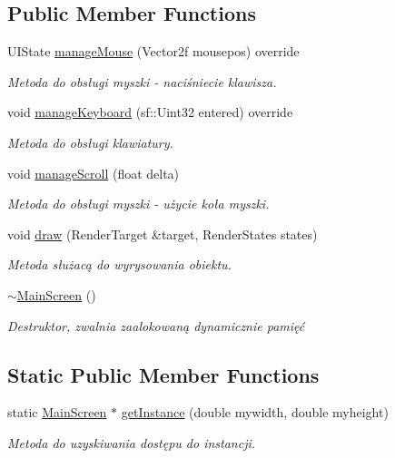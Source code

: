 \subsection*{Public Member Functions}
\begin{DoxyCompactItemize}
\item 
U\+I\+State \mbox{\hyperlink{class_main_screen_a767f261da366524c32b687b4cce0e85c}{manage\+Mouse}} (Vector2f mousepos) override
\begin{DoxyCompactList}\small\item\em Metoda do obsługi myszki -\/ naciśniecie klawisza. \end{DoxyCompactList}\item 
void \mbox{\hyperlink{class_main_screen_ac0e2f8d06e1a7fef07d52730b94132d3}{manage\+Keyboard}} (sf\+::\+Uint32 entered) override
\begin{DoxyCompactList}\small\item\em Metoda do obsługi klawiatury. \end{DoxyCompactList}\item 
void \mbox{\hyperlink{class_main_screen_a54826570ce34b97e35f89fdc90b98bed}{manage\+Scroll}} (float delta)
\begin{DoxyCompactList}\small\item\em Metoda do obsługi myszki -\/ użycie koła myszki. \end{DoxyCompactList}\item 
void \mbox{\hyperlink{class_main_screen_a4869b4bcd4bc03ef503904395bc4e68b}{draw}} (Render\+Target \&target, Render\+States states)
\begin{DoxyCompactList}\small\item\em Metoda służacą do wyrysowania obiektu. \end{DoxyCompactList}\item 
\mbox{\label{class_main_screen_aee105103c9a26e27a4fc9b972948d527}} 
\mbox{\hyperlink{class_main_screen_aee105103c9a26e27a4fc9b972948d527}{$\sim$\+Main\+Screen}} ()
\begin{DoxyCompactList}\small\item\em Destruktor, zwalnia zaalokowaną dynamicznie pamięć \end{DoxyCompactList}\end{DoxyCompactItemize}
\subsection*{Static Public Member Functions}
\begin{DoxyCompactItemize}
\item 
static \mbox{\hyperlink{class_main_screen}{Main\+Screen}} $\ast$ \mbox{\hyperlink{class_main_screen_a9e03cd8e4cccb0e4b9ba3b8c43d10785}{get\+Instance}} (double mywidth, double myheight)
\begin{DoxyCompactList}\small\item\em Metoda do uzyskiwania dostępu do instancji. \end{DoxyCompactList}\end{DoxyCompactItemize}

